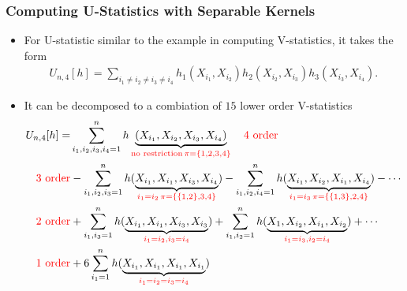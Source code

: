 \documentclass[9pt]{beamer}
\theoremstyle{mystyle}
\theoremstyle{mystyletwo}
\begin{document}
\begin{frame}
    \frametitle{Computing U-Statistics with Separable Kernels}
    \begin{itemize}
        \item For U-statistic similar to the example in computing V-statistics, it takes the form
              \begin{align*}
                  U_{n,4}[h] = \sum_{i_1 \neq i_2 \neq i_3 \neq i_4} h_1(X_{i_1}, X_{i_2}) h_2(X_{i_2}, X_{i_3}) h_3(X_{i_3}, X_{i_4}).
              \end{align*}
        \item It can be decomposed to a combiation of $15$ lower order V-statistics 
              \begin{align*}
                  U_{n,4}[h] = & \sum_{i_1,i_2,i_3,i_4=1}^{n} h\underbrace{(X_{i_1}, X_{i_2}, X_{i_3}, X_{i_4})}_{{\color{red} \text{no restriction}\, \pi = \{1,2,3,4\}}} \quad {\color{red} 4\text{ order}} \\
                    {\color{red} 3\text{ order}}& -\sum_{i_1,i_2,i_3 = 1}^{n} h(\underbrace{X_{i_1}, X_{i_1}, X_{i_3}, X_{i_4}}_{{\color{red} i_1=i_2 \, \pi=\{\{1,2\},3,4\}}}) - \sum_{i_1,i_2,i_4 =1}^{n} h(\underbrace{X_{i_1}, X_{i_2}, X_{i_1}, X_{i_4}}_{{\color{red} i_1=i_3 \, \pi = \{\{1,3\},2,4\}}}) - \cdots \\
                    {\color{red} 2\text{ order}}& +            \sum_{i_1,i_3 = 1}^{n} h(\underbrace{X_{i_1}, X_{i_1}, X_{i_3}, X_{i_3}}_{{\color{red} i_1=i_2,i_3=i_4}}) + \sum_{i_1,i_2 = 1}^{n} h(\underbrace{X_{1}, X_{i_2}, X_{i_1}, X_{i_2}}_{{\color{red} i_1=i_3,i_2=i_4}}) + \cdots \\
                    \color{red} 1\text{ order}& +6 \sum_{i_1= 1}^{n} h(\underbrace{X_{i_1}, X_{i_1}, X_{i_1}, X_{i_1}}_{{\color{red} i_1=i_2=i_3=i_4}})
              \end{align*}
    \end{itemize}
\end{frame}
\end{document}
